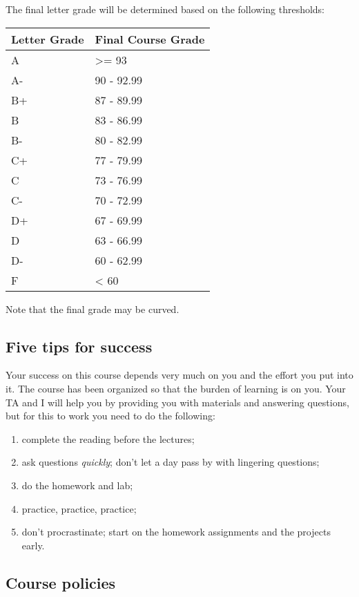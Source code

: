 \documentclass[
  letterpaper,
  DIV=11,
  numbers=noendperiod]{scrartcl}
\providecommand{\tightlist}{%
  \setlength{\itemsep}{0pt}\setlength{\parskip}{0pt}}
\begin{document}
The final letter grade will be determined based on the following
thresholds:

\begin{longtable}[]{@{}ll@{}}
\toprule
Letter Grade & Final Course Grade \\
\midrule
\endhead
A & \textgreater= 93 \\
A- & 90 - 92.99 \\
B+ & 87 - 89.99 \\
B & 83 - 86.99 \\
B- & 80 - 82.99 \\
C+ & 77 - 79.99 \\
C & 73 - 76.99 \\
C- & 70 - 72.99 \\
D+ & 67 - 69.99 \\
D & 63 - 66.99 \\
D- & 60 - 62.99 \\
F & \textless{} 60 \\
\bottomrule
\end{longtable}

Note that the final grade may be curved.

\hypertarget{five-tips-for-success}{%
\subsection{Five tips for success}\label{five-tips-for-success}}

Your success on this course depends very much on you and the effort you
put into it. The course has been organized so that the burden of
learning is on you. Your TA and I will help you by providing you with
materials and answering questions, but for this to work you need to do
the following:

\begin{enumerate}
\def\labelenumi{\arabic{enumi}.}
\tightlist
\item
  complete the reading before the lectures;
\item
  ask questions \emph{quickly}; don't let a day pass by with lingering
  questions;
\item
  do the homework and lab;
\item
  practice, practice, practice;
\item
  don't procrastinate; start on the homework assignments and the
  projects early.
\end{enumerate}

\hypertarget{course-policies}{%
\subsection{Course policies}\label{course-policies}}
\end{document}
